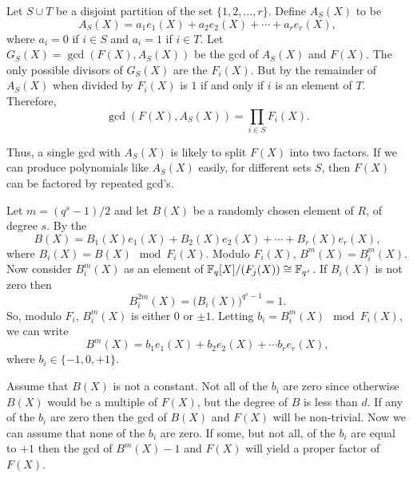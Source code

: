 Let $S \cup T$ be a disjoint partition of the set $\{1, 2, \ldots, r
\}$.  Define $A_S(X)$ to be 
\[
A_S(X) = a_1 e_1(X) + a_2 e_2(X) + \cdots + a_r e_r(X),
\]
where $a_i = 0$ if $i \in S$ and $a_i = 1$ if $i \in T$.  Let $G_S(X)
= \gcd(F(X), A_S(X))$ be the {\sc gcd} of $A_S(X)$ and $F(X)$.  The
only possible divisors of $G_S(X)$ are the $F_i(X)$. But by
 the remainder of $A_S(X)$ when divided by
$F_i(X)$ is $1$ if and only if $i$ is an element of $T$.  Therefore,
\[
\gcd(F(X), A_S(X)) = \prod_{i \in S} F_i(X).
\]

Thus, a single {\sc gcd} with $A_S(X)$ is likely to split $F(X)$ into
two factors.  If we can produce polynomials like $A_S(X)$ easily, for
different sets $S$, then $F(X)$ can be factored by repeated {\sc
gcd}'s.

Let $m = (q^s -1)/2$ and let $B(X)$ be a randomly chosen element of
$R$, of degree $s$.  By the 
\[
B(X) = B_1(X) e_1(X) + B_2(X) e_2(X) +\cdots + B_r(X) e_r(X),
\]
where $B_i(X) = B(X) \mod{F_i(X)}$.  Modulo $F_i(X)$, $B^m(X) =
B_i^m(X)$.  Now consider $B_i^m(X)$ as an element of $\mathbb{F}_q[X]/(F_j(X))
\cong \mathbb{F}_{q^s}$.  If $B_i(X)$ is not zero then
\[
B_i^{2m}(X) = \bigl(B_i(X)\bigr)^{q^s - 1} = 1.
\]
So, modulo $F_i$, $B_i^m(X)$ is either $0$ or $\pm 1$.  Letting $b_i =
B_i^m(X) \mod{F_i(X)}$, we can write 
\[
B^m(X) = b_1 e_1(X) + b_2 e_2(X) + \cdots b_r e_r(X),
\]
where $b_i \in \{-1, 0, +1 \}$.

Assume that $B(X)$ is not a constant.  Not all of the $b_i$ are zero
since otherwise $B(X)$ would be a multiple of $F(X)$, but the degree
of $B$ is less than $d$.  If any of the $b_i$ are zero then the {\sc
gcd} of $B(X)$ and $F(X)$ will be non-trivial.  Now we can assume that
none of the $b_i$ are zero.  If some, but not all, of the $b_i$ are
equal to $+1$ then the {\sc gcd} of $B^m(X)-1$ and $F(X)$ will
yield a proper factor of $F(X)$.  

